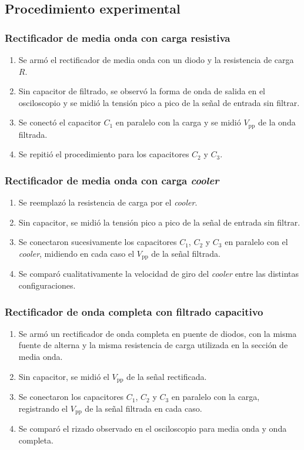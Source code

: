 \documentclass[a4paper,12pt]{article}
\begin{document}
\subsection{Procedimiento experimental}

\subsubsection*{Rectificador de media onda con carga resistiva}
\begin{enumerate}
    \item Se armó el rectificador de media onda con un diodo y la resistencia de carga \(R\).
    \item Sin capacitor de filtrado, se observó la forma de onda de salida en el osciloscopio y se midió la tensión pico a pico de la señal de entrada sin filtrar.
    \item Se conectó el capacitor \(C_1\) en paralelo con la carga y se midió \(V_{\text{pp}}\) de la onda filtrada.
    \item Se repitió el procedimiento para los capacitores \(C_2\) y \(C_3\).
\end{enumerate}

\subsubsection*{Rectificador de media onda con carga \emph{cooler}}
\begin{enumerate}
    \item Se reemplazó la resistencia de carga por el \emph{cooler}.
    \item Sin capacitor, se midió la tensión pico a pico de la señal de entrada sin filtrar.
    \item Se conectaron sucesivamente los capacitores \(C_1\), \(C_2\) y \(C_3\) en paralelo con el \emph{cooler}, midiendo en cada caso el \(V_{\text{pp}}\) de la señal filtrada.
    \item Se comparó cualitativamente la velocidad de giro del \emph{cooler} entre las distintas configuraciones.
\end{enumerate}

\subsubsection*{Rectificador de onda completa con filtrado capacitivo}
\begin{enumerate}
    \item Se armó un rectificador de onda completa en puente de diodos, con la misma fuente de alterna y la misma resistencia de carga utilizada en la sección de media onda.
    \item Sin capacitor, se midió el \(V_{\text{pp}}\) de la señal rectificada.
    \item Se conectaron los capacitores \(C_1\), \(C_2\) y \(C_3\) en paralelo con la carga, registrando el \(V_{\text{pp}}\) de la señal filtrada en cada caso.
    \item Se comparó el rizado observado en el osciloscopio para media onda y onda completa.
\end{enumerate}
\end{document}
